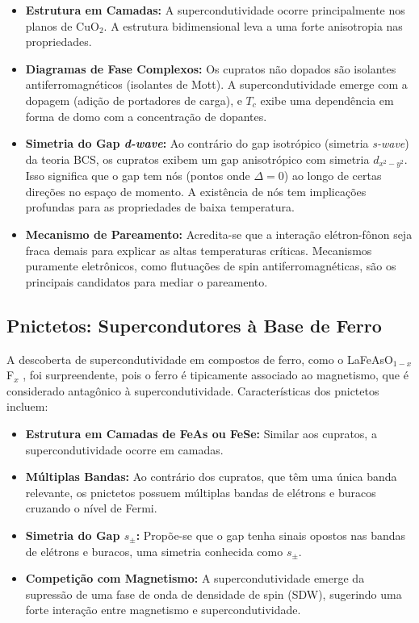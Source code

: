 \documentclass[12pt, a4paper, oneside]{report}
\begin{document}
\begin{itemize}
    \item \textbf{Estrutura em Camadas:} A supercondutividade ocorre principalmente nos planos de CuO$_2$. A estrutura bidimensional leva a uma forte anisotropia nas propriedades.
    \item \textbf{Diagramas de Fase Complexos:} Os cupratos não dopados são isolantes antiferromagnéticos (isolantes de Mott). A supercondutividade emerge com a dopagem (adição de portadores de carga), e $T_c$ exibe uma dependência em forma de domo com a concentração de dopantes.
    \item \textbf{Simetria do Gap \textit{d-wave}:} Ao contrário do gap isotrópico (simetria \textit{s-wave}) da teoria BCS, os cupratos exibem um gap anisotrópico com simetria $d_{x^2-y^2}$. Isso significa que o gap tem nós (pontos onde $\Delta = 0$) ao longo de certas direções no espaço de momento. A existência de nós tem implicações profundas para as propriedades de baixa temperatura.
    \item \textbf{Mecanismo de Pareamento:} Acredita-se que a interação elétron-fônon seja fraca demais para explicar as altas temperaturas críticas. Mecanismos puramente eletrônicos, como flutuações de spin antiferromagnéticas, são os principais candidatos para mediar o pareamento.
\end{itemize}

\subsection{Pnictetos: Supercondutores à Base de Ferro}

A descoberta de supercondutividade em compostos de ferro, como o LaFeAsO$_{1-x}$F$_x$ \cite{kamihara2008}, foi surpreendente, pois o ferro é tipicamente associado ao magnetismo, que é considerado antagônico à supercondutividade. Características dos pnictetos incluem:

\begin{itemize}
    \item \textbf{Estrutura em Camadas de FeAs ou FeSe:} Similar aos cupratos, a supercondutividade ocorre em camadas.
    \item \textbf{Múltiplas Bandas:} Ao contrário dos cupratos, que têm uma única banda relevante, os pnictetos possuem múltiplas bandas de elétrons e buracos cruzando o nível de Fermi.
    \item \textbf{Simetria do Gap $s_\pm$:} Propõe-se que o gap tenha sinais opostos nas bandas de elétrons e buracos, uma simetria conhecida como $s_\pm$.
    \item \textbf{Competição com Magnetismo:} A supercondutividade emerge da supressão de uma fase de onda de densidade de spin (SDW), sugerindo uma forte interação entre magnetismo e supercondutividade.
\end{itemize}
\end{document}
